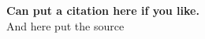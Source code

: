 \thispagestyle{empty} %
\null\vfill
\begin{center}
	\textbf{Can put a citation here if you like.}\\
	{\small And here put the source }	
\end{center}
\null\vfill
